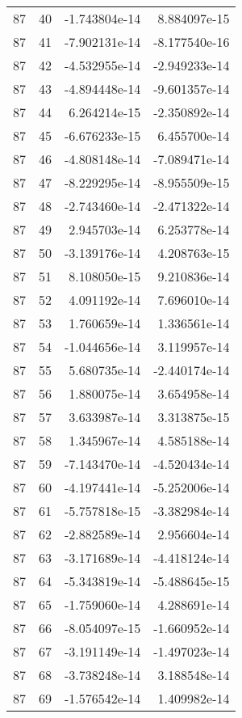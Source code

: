\begin{tabular}{rrrr}
  87 &   40 & -1.743804e-14 &  8.884097e-15 \\
  87 &   41 & -7.902131e-14 & -8.177540e-16 \\
  87 &   42 & -4.532955e-14 & -2.949233e-14 \\
  87 &   43 & -4.894448e-14 & -9.601357e-14 \\
  87 &   44 &  6.264214e-15 & -2.350892e-14 \\
  87 &   45 & -6.676233e-15 &  6.455700e-14 \\
  87 &   46 & -4.808148e-14 & -7.089471e-14 \\
  87 &   47 & -8.229295e-14 & -8.955509e-15 \\
  87 &   48 & -2.743460e-14 & -2.471322e-14 \\
  87 &   49 &  2.945703e-14 &  6.253778e-14 \\
  87 &   50 & -3.139176e-14 &  4.208763e-15 \\
  87 &   51 &  8.108050e-15 &  9.210836e-14 \\
  87 &   52 &  4.091192e-14 &  7.696010e-14 \\
  87 &   53 &  1.760659e-14 &  1.336561e-14 \\
  87 &   54 & -1.044656e-14 &  3.119957e-14 \\
  87 &   55 &  5.680735e-14 & -2.440174e-14 \\
  87 &   56 &  1.880075e-14 &  3.654958e-14 \\
  87 &   57 &  3.633987e-14 &  3.313875e-15 \\
  87 &   58 &  1.345967e-14 &  4.585188e-14 \\
  87 &   59 & -7.143470e-14 & -4.520434e-14 \\
  87 &   60 & -4.197441e-14 & -5.252006e-14 \\
  87 &   61 & -5.757818e-15 & -3.382984e-14 \\
  87 &   62 & -2.882589e-14 &  2.956604e-14 \\
  87 &   63 & -3.171689e-14 & -4.418124e-14 \\
  87 &   64 & -5.343819e-14 & -5.488645e-15 \\
  87 &   65 & -1.759060e-14 &  4.288691e-14 \\
  87 &   66 & -8.054097e-15 & -1.660952e-14 \\
  87 &   67 & -3.191149e-14 & -1.497023e-14 \\
  87 &   68 & -3.738248e-14 &  3.188548e-14 \\
  87 &   69 & -1.576542e-14 &  1.409982e-14 \\

\end{tabular}
